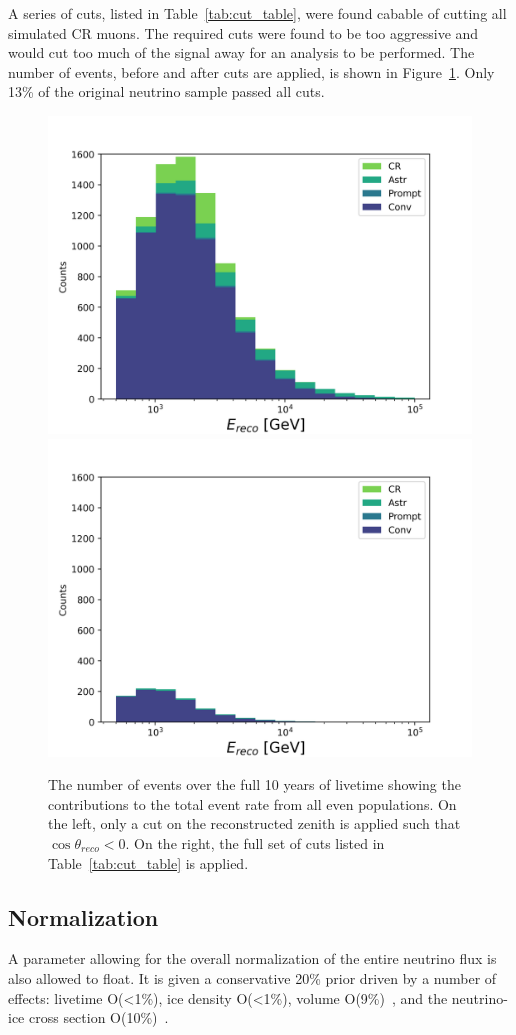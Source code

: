 \documentclass[main.tex]{subfiles}
\begin{document}
A series of cuts, listed in Table~\ref{tab:cut_table}, were found cabable of cutting all simulated CR muons. 
The required cuts were found to be too aggressive and would cut too much of the signal away for an analysis to be performed. 
The number of events, before and after cuts are applied, is shown in Figure~\ref{fig:cut_figure}.
Only 13\% of the original neutrino sample passed all cuts. 

\begin{figure}
    \centering
    \includegraphics[width=0.45\linewidth]{figures/zenith_only_cut.png}%
    \includegraphics[width=0.45\linewidth]{figures/all_cuts.png}
    \caption{The number of events over the full 10 years of livetime showing the contributions to the total event rate from all even populations. On the left, only a cut on the reconstructed zenith is applied such that $\cos\theta_{reco}<0$. On the right, the full set of cuts listed in Table~\ref{tab:cut_table} is applied. }\label{fig:cut_figure}
\end{figure}

\subsection{Normalization}

A parameter allowing for the overall normalization of the entire neutrino flux is also allowed to float. It is given a conservative 20\% prior driven by a number of effects: livetime O(<1\%), ice density O(<1\%), volume O(9\%)~\cite{Sandrock_2020}, and the neutrino-ice cross section O(10\%)~\cite{candido2023neutrino}.
\end{document}
